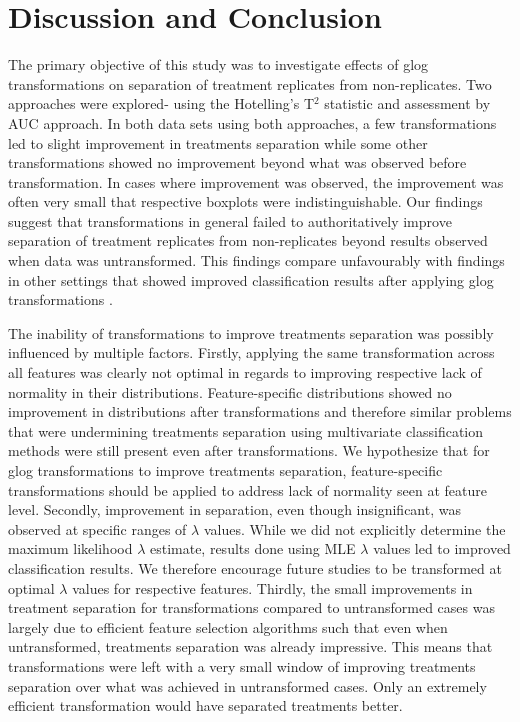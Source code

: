 \documentclass[11pt]{article}
\begin{document}
\clearpage
\section{Discussion and Conclusion}\label{discussconclude}
\par{The primary objective of this study was to investigate effects of glog transformations on separation of treatment replicates from non-replicates. Two approaches were explored- using the Hotelling's T$^2$ statistic and assessment by AUC approach. In both data sets using both approaches, a few transformations led to slight improvement in treatments separation while some other transformations showed no improvement beyond what was observed before transformation. In cases where improvement was observed, the improvement was often very small that respective boxplots were indistinguishable. Our findings suggest that transformations in general failed to authoritatively improve separation of treatment replicates from non-replicates beyond results observed when data was untransformed. This findings compare unfavourably with findings in other settings that showed improved classification results after applying glog transformations \cite{Purohit2004, Parsons2007}.}
\par{The inability of transformations to improve treatments separation was possibly influenced by multiple factors. Firstly, applying the same transformation across all features was clearly not optimal in regards to improving respective lack of normality in their distributions. Feature-specific distributions showed no improvement in distributions after transformations and therefore similar problems that were undermining treatments separation using multivariate classification methods were still present even after transformations. We hypothesize that for glog transformations to improve treatments separation, feature-specific transformations should be applied to address lack of normality seen at feature level. Secondly, improvement in separation, even though insignificant, was observed at specific ranges of $\lambda$ values. While we did not explicitly determine the maximum likelihood $\lambda$ estimate, results done using MLE $\lambda$ values \cite{Parsons2007} led to improved classification results. We therefore encourage future studies to be transformed at optimal $\lambda$ values for respective features. Thirdly, the small improvements in treatment separation for transformations compared to untransformed cases was largely due to efficient feature selection algorithms such that even when untransformed, treatments separation was already impressive. This means that transformations were left with a very small window of improving treatments separation over what was achieved in untransformed cases. Only an extremely efficient transformation would have separated treatments better.}
\end{document}
